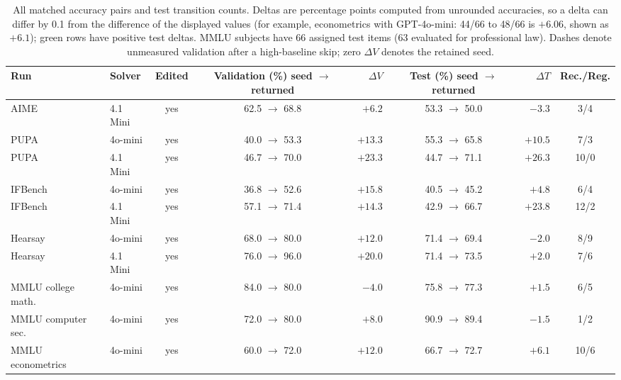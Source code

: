 \documentclass[10pt]{article} %
\begin{document}
\begin{table}[htbp]
\caption{All matched accuracy pairs and test transition counts. Deltas are percentage points computed from unrounded accuracies, so a delta can differ by 0.1 from the difference of the displayed values (for example, econometrics with GPT-4o-mini: 44/66 to 48/66 is $+6.06$, shown as $+6.1$);
green rows have positive test deltas. MMLU subjects have 66 assigned test items (63 evaluated for professional law).
Dashes denote unmeasured validation after a high-baseline skip; zero $\Delta V$ denotes the retained seed.}
\label{tab:pergap}
\begin{center}
\small
\setlength{\tabcolsep}{4pt}
\begin{tabular}{llccrcrc}
\toprule
\rowcolor{midblue}Run & Solver & Edited & \shortstack{Validation (\%)\\seed $\rightarrow$ returned} & $\Delta V$ & \shortstack{Test (\%)\\seed $\rightarrow$ returned} & $\Delta T$ & Rec./Reg. \\
\midrule
AIME & 4.1 Mini & yes & 62.5 $\rightarrow$ 68.8 & $+6.2$ & 53.3 $\rightarrow$ 50.0 & $-3.3$ & 3/4 \\
\rowcolor{softgreen}PUPA & 4o-mini & yes & 40.0 $\rightarrow$ 53.3 & $+13.3$ & 55.3 $\rightarrow$ 65.8 & $+10.5$ & 7/3 \\
\rowcolor{softgreen}PUPA & 4.1 Mini & yes & 46.7 $\rightarrow$ 70.0 & $+23.3$ & 44.7 $\rightarrow$ 71.1 & $+26.3$ & 10/0 \\
\rowcolor{softgreen}IFBench & 4o-mini & yes & 36.8 $\rightarrow$ 52.6 & $+15.8$ & 40.5 $\rightarrow$ 45.2 & $+4.8$ & 6/4 \\
\rowcolor{softgreen}IFBench & 4.1 Mini & yes & 57.1 $\rightarrow$ 71.4 & $+14.3$ & 42.9 $\rightarrow$ 66.7 & $+23.8$ & 12/2 \\
Hearsay & 4o-mini & yes & 68.0 $\rightarrow$ 80.0 & $+12.0$ & 71.4 $\rightarrow$ 69.4 & $-2.0$ & 8/9 \\
\rowcolor{softgreen}Hearsay & 4.1 Mini & yes & 76.0 $\rightarrow$ 96.0 & $+20.0$ & 71.4 $\rightarrow$ 73.5 & $+2.0$ & 7/6 \\
\midrule
\rowcolor{softgreen}MMLU college math. & 4o-mini & yes & 84.0 $\rightarrow$ 80.0 & $-4.0$ & 75.8 $\rightarrow$ 77.3 & $+1.5$ & 6/5 \\
MMLU computer sec. & 4o-mini & yes & 72.0 $\rightarrow$ 80.0 & $+8.0$ & 90.9 $\rightarrow$ 89.4 & $-1.5$ & 1/2 \\
\rowcolor{softgreen}MMLU econometrics & 4o-mini & yes & 60.0 $\rightarrow$ 72.0 & $+12.0$ & 66.7 $\rightarrow$ 72.7 & $+6.1$ & 10/6 \\

\end{tabular}
\end{center}
\end{table}
\end{document}
